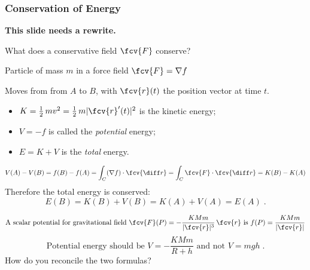 \begin{frame}

  \frametitle{Conservation of Energy}

\textbf{This slide needs a rewrite. }

  What does a conservative field $\fcv{F}$ conserve?

  \pause Particle of mass $m$ in a force field $\fcv{F} = \nabla f$

  \pause Moves from from $A$ to $B$, with $\fcv{r}(t)$ the position vector at time $t$.

  \begin{itemize}
    \item \pause $K = \frac{1}{2}\, mv^2 = \frac{1}{2}\, m|\fcv{r}'(t)|^2$ is the kinetic energy;
    \item \pause $V=-f$ is called the \emph{potential} energy;
    \item \pause $E=K+V$ is the
\emph{total} energy.
  \end{itemize}
  $$V(A)-V(B) = f(B) - f(A) = \int_C (\nabla f) \cdot \fcv{\diff r} = \int_C \fcv{F} \cdot \fcv{\diff r} = K(B)-K(A)$$
  \pause Therefore the total energy is conserved:
  $$E(B) = K(B)+V(B) = K(A)+V(A) = E(A)\; .$$

\pause
%
$$\text{A scalar potential for gravitational field } \fcv{F}(P) = -\frac{KMm}{|\fcv{r}|^3}\, \fcv{r} \text{ is } f(P) = \frac{KMm}{|\fcv{r}|}  $$
%
$$\text{Potential energy should be } V = -\frac{KMm}{R+h} \text{ and not } V = mgh\; .$$
\pause How do you reconcile the two formulas?
\end{frame}